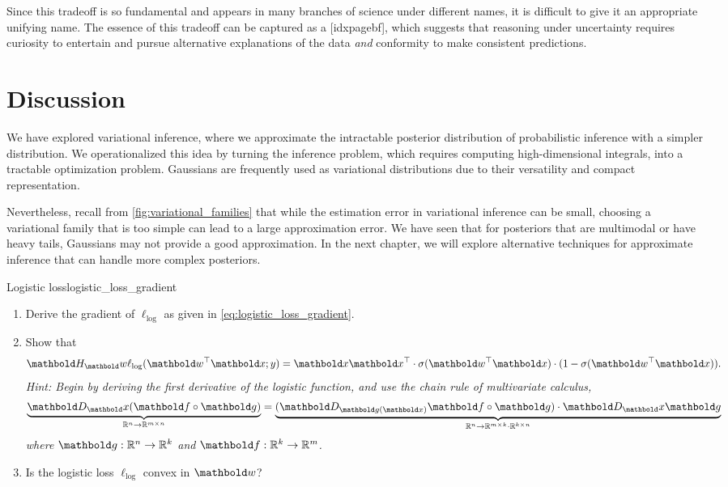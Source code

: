 Since this tradeoff is so fundamental and appears in many branches of science under different names, it is difficult to give it an appropriate unifying name.
The essence of this tradeoff can be captured as a [idxpagebf], which suggests that reasoning under uncertainty requires curiosity to entertain and pursue alternative explanations of the data \emph{and} conformity to make consistent predictions.

\section*{Discussion}

We have explored variational inference, where we approximate the intractable posterior distribution of probabilistic inference with a simpler distribution.
We operationalized this idea by turning the inference problem, which requires computing high-dimensional integrals, into a tractable optimization problem.
Gaussians are frequently used as variational distributions due to their versatility and compact representation.

Nevertheless, recall from \cref{fig:variational_families} that while the estimation error in variational inference can be small, choosing a variational family that is too simple can lead to a large approximation error.
We have seen that for posteriors that are multimodal or have heavy tails, Gaussians may not provide a good approximation.
In the next chapter, we will explore alternative techniques for approximate inference that can handle more complex posteriors.

\excheading

\begin{nexercise}{Logistic loss}{logistic_loss_gradient}
  \begin{enumerate}
    \item Derive the gradient of $\ell_\mathrm{log}$ as given in \cref{eq:logistic_loss_gradient}.
    \item Show that \begin{align}
      \hes_\vw \ell_\mathrm{log}(\transpose{\vw} \vx; y) = \vx \transpose{\vx} \cdot \sigma(\transpose{\vw} \vx) \cdot (1 - \sigma(\transpose{\vw} \vx)). \label{eq:logistic_loss_hes}
    \end{align}
    \textit{Hint: Begin by deriving the first derivative of the logistic function, and use the chain rule of multivariate calculus, \begin{align}
      \underbrace{\mD_\vx (\vf \circ \vg)}_{\R^n \to \R^{m \times n}} = \underbrace{(\mD_{\vg(\vx)} \vf \circ \vg) \cdot \mD_\vx \vg}_{\R^n \to \R^{m \times k} \cdot \R^{k \times n}} \label{eq:chain_rule}
    \end{align} where $\vg : \R^n \to \R^k$ and $\vf : \R^k \to \R^m$.}
    \item Is the logistic loss $\ell_\mathrm{log}$ convex in $\vw$?
  \end{enumerate}
\end{nexercise}

